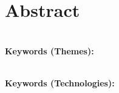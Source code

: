 \titleformat{\chapter}[display]
  {\normalfont\bfseries}{}{0pt}{\Huge}

\chapter*{Abstract}


\textbf{\\Keywords (Themes):} 

\textbf{\\Keywords (Technologies):} 
